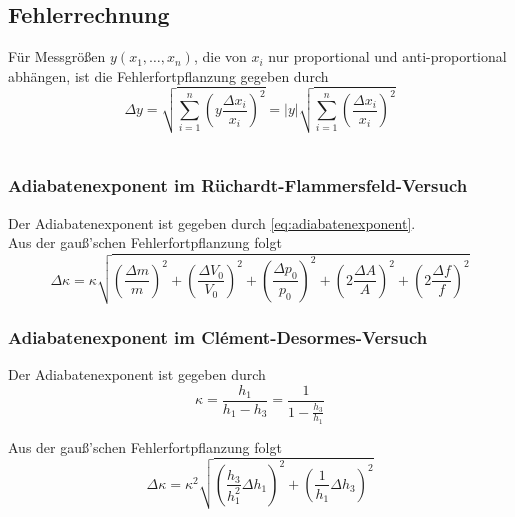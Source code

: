 \label{anhang}

\subsection{Fehlerrechnung}
Für Messgrößen $ y(x_1, \dots, x_n) $, die von $ x_i $ nur proportional und anti-proportional abhängen, ist die Fehlerfortpflanzung gegeben durch
\begin{equation}
	\Delta y = \sqrt{\sum_{i=1}^{n}\left(y\frac{\Delta x_i}{x_i}\right)^2} 
		= |y|\sqrt{\sum_{i=1}^{n}\left(\frac{\Delta x_i}{x_i}\right)^2}  \label{eq:err_lin}
\end{equation}\\

\subsubsection{Adiabatenexponent im Rüchardt-Flammersfeld-Versuch}
Der Adiabatenexponent ist gegeben durch \eqref{eq:adiabatenexponent}.\\
Aus der gauß'schen Fehlerfortpflanzung folgt
\begin{equation}
	\Delta \kappa = \kappa \sqrt{\left(\frac{\Delta m}{m}\right)^2 + \left(\frac{\Delta V_0}{V_0}\right)^2 + \left(\frac{\Delta p_0}{p_0}\right)^2 + \left(2\frac{\Delta A}{A}\right)^2 + \left(2\frac{\Delta f}{f}\right)^2} \label{eq:err_k}
\end{equation}



\subsubsection{Adiabatenexponent im Clément-Desormes-Versuch}
Der Adiabatenexponent ist gegeben durch
\begin{equation*}
\kappa = \frac{h_1}{h_1 - h_3} = \frac{1}{1 - \frac{h_3}{h_1}}
\end{equation*}

Aus der gauß'schen Fehlerfortpflanzung folgt
\begin{equation}
	\Delta \kappa = \kappa^2\sqrt{\left(\frac{h_3}{h_1^2}\Delta h_1\right)^2 + \left(\frac{1}{h_1}\Delta h_3\right)^2} \label{eq:err_k2}
\end{equation}
